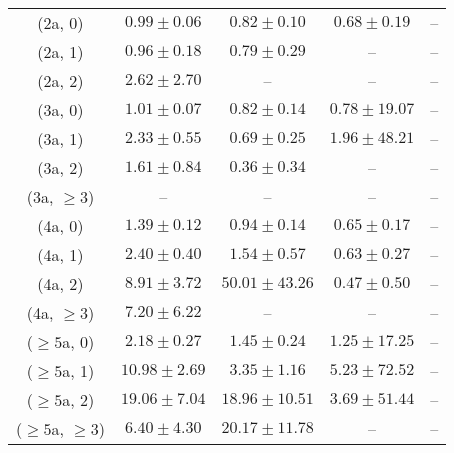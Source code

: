 \begin{table}[h!]
{\begin{tabular}{ccccc}
	(2a, 0) & $0.99\pm 0.06$ & $0.82\pm 0.10$ & $0.68\pm 0.19$ & -- \\[0.5ex] 
	(2a, 1) & $0.96\pm 0.18$ & $0.79\pm 0.29$ & -- & -- \\[0.5ex] 
	(2a, 2) & $2.62\pm 2.70$ & -- & -- & -- \\[0.5ex] 
	(3a, 0) & $1.01\pm 0.07$ & $0.82\pm 0.14$ & $0.78\pm 19.07$ & -- \\[0.5ex] 
	(3a, 1) & $2.33\pm 0.55$ & $0.69\pm 0.25$ & $1.96\pm 48.21$ & -- \\[0.5ex] 
	(3a, 2) & $1.61\pm 0.84$ & $0.36\pm 0.34$ & -- & -- \\[0.5ex] 
	(3a, $\ge3$) & -- & -- & -- & -- \\[0.5ex] 
	(4a, 0) & $1.39\pm 0.12$ & $0.94\pm 0.14$ & $0.65\pm 0.17$ & -- \\[0.5ex] 
	(4a, 1) & $2.40\pm 0.40$ & $1.54\pm 0.57$ & $0.63\pm 0.27$ & -- \\[0.5ex] 
	(4a, 2) & $8.91\pm 3.72$ & $50.01\pm 43.26$ & $0.47\pm 0.50$ & -- \\[0.5ex] 
	(4a, $\ge3$) & $7.20\pm 6.22$ & -- & -- & -- \\[0.5ex] 
	($\ge5$a, 0) & $2.18\pm 0.27$ & $1.45\pm 0.24$ & $1.25\pm 17.25$ & -- \\[0.5ex] 
	($\ge5$a, 1) & $10.98\pm 2.69$ & $3.35\pm 1.16$ & $5.23\pm 72.52$ & -- \\[0.5ex] 
	($\ge5$a, 2) & $19.06\pm 7.04$ & $18.96\pm 10.51$ & $3.69\pm 51.44$ & -- \\[0.5ex] 
	($\ge5$a, $\ge3$) & $6.40\pm 4.30$ & $20.17\pm 11.78$ & -- & -- \\[0.5ex] 
	\hline
	\hline
\end{tabular}}
\end{table}
